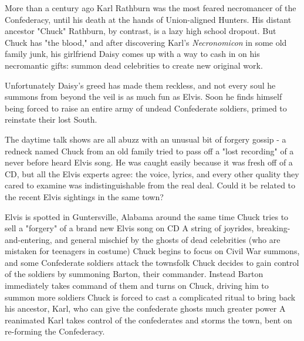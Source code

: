 \documentclass{motw}
\begin{document}




More than a century ago Karl Rathburn was the most feared necromancer of the Confederacy, until his death at the hands of Union-aligned Hunters.  His distant ancestor "Chuck" Rathburn, by contrast, is a lazy high school dropout. But Chuck has "the blood," and after discovering  Karl's \emph{Necronomicon} in some old family junk, his girlfriend Daisy comes up with a way to cash in on his necromantic gifts: summon dead celebrities to create new original work.

Unfortunately Daisy's greed has made them reckless, and not every soul he summons from beyond the veil is as much fun as Elvis.  Soon he finds himself being forced to raise an entire army of undead Confederate soldiers, primed to reinstate their lost South.


The daytime talk shows are all abuzz with an unusual bit of forgery gossip - a redneck named Chuck from an old family tried to pass off a "lost recording" of a never before heard Elvis song.  He was caught easily because it was fresh off of a CD, but all the Elvis experts agree: the voice, lyrics, and every other quality they cared to examine was indistinguishable from the real deal.  Could it be related to the recent Elvis sightings in the same town?

\Countdown%
{Elvis is spotted in Guntersville, Alabama around the same time Chuck tries to sell a "forgery" of a brand new Elvis song on CD}%
{A string of joyrides, breaking-and-entering, and general mischief by the ghosts of dead celebrities (who are mistaken for teenagers in costume)}%
{Chuck begins to focus on Civil War summons, and some Confederate soldiers attack the townsfolk}%
{Chuck decides to gain control of the soldiers by summoning Barton, their commander.  Instead Barton immediately takes command of them and turns on Chuck, driving him to summon more soldiers}%
{Chuck is forced to cast a complicated ritual to bring back his ancestor, Karl, who can give the confederate ghosts much greater power}%
{A reanimated Karl takes control of the confederates and storms the town, bent on re-forming the Confederacy.}%
\end{document}
